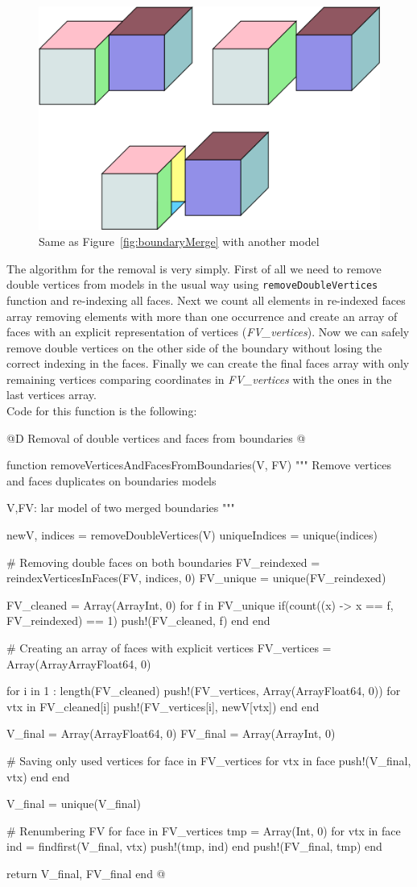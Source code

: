 \documentclass[11pt,oneside]{article}	%
\begin{document}
\begin{figure}[htb] %
   \centering
   \includegraphics[width=0.40\linewidth]{images/BoundaryMerge2.png}
   \caption{Same as Figure~\ref{fig:boundaryMerge} with another model}
   \label{fig:boundaryMerge2}
\end{figure}

The algorithm for the removal is very simply. First of all we need to remove double vertices from models in the usual way using \texttt{removeDoubleVertices} function and re-indexing all faces. Next we count all elements in re-indexed faces array removing elements with more than one occurrence and create an array of faces with an explicit representation of vertices (\textit{FV\_vertices}). Now we can safely remove double vertices on the other side of the boundary without losing the correct indexing in the faces. Finally we can create the final faces array with only remaining vertices comparing coordinates in \textit{FV\_vertices} with the ones in the last vertices array.\\
Code for this function is the following:

@D Removal of double vertices and faces from boundaries
@{function removeVerticesAndFacesFromBoundaries(V, FV)
  """
  Remove vertices and faces duplicates on
  boundaries models

  V,FV: lar model of two merged boundaries
  """

  newV, indices = removeDoubleVertices(V)
  uniqueIndices = unique(indices)

  # Removing double faces on both boundaries
  FV_reindexed = reindexVerticesInFaces(FV, indices, 0)
  FV_unique = unique(FV_reindexed)

  FV_cleaned = Array(Array{Int}, 0)
  for f in FV_unique
    if(count((x) -> x == f, FV_reindexed) == 1)
      push!(FV_cleaned, f)
    end
  end

  # Creating an array of faces with explicit vertices
  FV_vertices = Array(Array{Array{Float64}}, 0)

  for i in 1 : length(FV_cleaned)
    push!(FV_vertices, Array(Array{Float64}, 0))
    for vtx in FV_cleaned[i]
      push!(FV_vertices[i], newV[vtx])
    end
  end

  V_final = Array(Array{Float64}, 0)
  FV_final = Array(Array{Int}, 0)

  # Saving only used vertices
  for face in FV_vertices
    for vtx in face
      push!(V_final, vtx)
    end
  end

  V_final = unique(V_final)

  # Renumbering FV
  for face in FV_vertices
    tmp = Array(Int, 0)
    for vtx in face
      ind = findfirst(V_final, vtx)
      push!(tmp, ind)
    end
    push!(FV_final, tmp)
  end

  return V_final, FV_final
end @}
\end{document}
